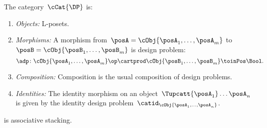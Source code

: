 \begin{definition}
    The category~$\cCat{\DP}$ is:
    \begin{enumerate}
        \item \emph{Objects:}
              L-posets.
        \item \emph{Morphisms:}
              A morphism from~$\posA =\cObj{\posA_1,\ldots, \posA_m}$ to~$\posB = \cObj{\posB_1,\ldots, \posB_m}$ is design problem:
              \begin{equation*}
                  \adp\colon \cObj{\posA_1,\ldots, \posA_m}\op \cartprod \cObj{\posB_1,\ldots, \posB_m} \toinPos \Bool.
              \end{equation*}
        \item \emph{Composition:}
              Composition is the usual composition of design problems.
        \item \emph{Identities:}
              The identity morphism on an object~$\Tupcatt {\posA_1} \dots {\posA_n}$ is given by the identity design problem~$\catid_{\cObj{\posA_1,\ldots, \posA_n}}$.
    \end{enumerate}
\end{definition}

\begin{lemma}
    \cCat{\DP} is associative stacking.
\end{lemma}

